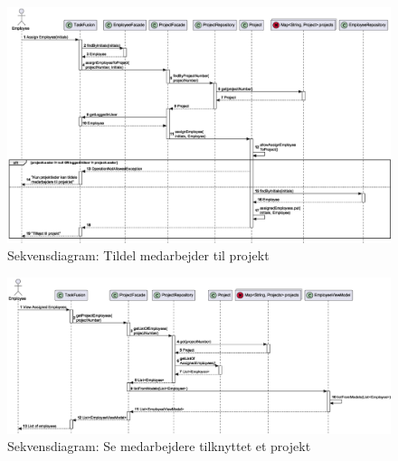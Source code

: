 \begin{figure}[H]
    \centering
    \caption{Sekvensdiagram: Tildel medarbejder til projekt}\label{fig:sequenceAssignEmployee}
    \includegraphics[width=\textwidth]{RequirementsAndDesign/SequenceDiagrams/seqAssignEmployee.eps}
\end{figure}
\begin{figure}[H]
    \centering
    \caption{Sekvensdiagram: Se medarbejdere tilknyttet et projekt}\label{fig:ViewAssignedEmployee}
    \includegraphics[width=\textwidth]{RequirementsAndDesign/SequenceDiagrams/seqViewAssignedEmployees.eps}
\end{figure}
